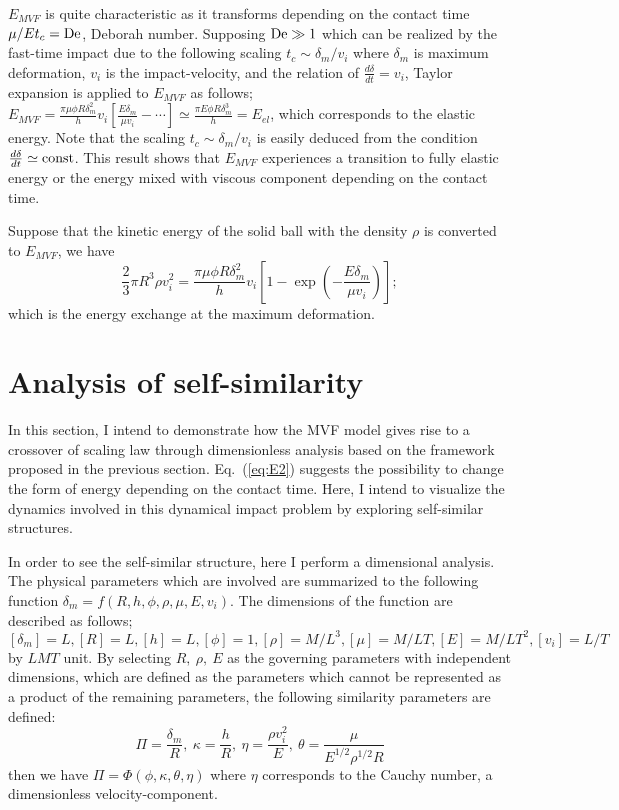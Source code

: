 \documentclass[default,iicol,10pt]{sn-jnl}%
\theoremstyle{thmstyleone}%
\theoremstyle{thmstyletwo}%
\theoremstyle{thmstylethree}%
\begin{document}
$E_{MVF}$ is quite characteristic as it transforms depending on the contact time $ \mu / E t_c =  {\rm De}$, Deborah number\cite{Reiner}. Supposing  ${\rm De} \gg 1$ which can be realized by the fast-time impact due to the following scaling $t_c \sim \delta_m / {v_i}$ where $\delta_m$ is maximum deformation, $v_i$ is the impact-velocity, and the relation of $\frac{ d \delta}{dt} = v_i$,  Taylor expansion is applied to $E_{MVF}$ as follows; $E_{MVF} = \frac{\pi \mu \phi R \delta_m^2 }{h} v_i \left[  \frac{E \delta_m}{\mu v_i} - \cdots \right] \simeq  \frac{\pi E \phi R \delta_m^3 }{h} = E_{el} $, which corresponds to the elastic energy\cite{Maruoka2019,Chastel2016}. Note that the scaling $t_c \sim \delta_m / v_i$ is easily deduced from the condition $\frac{d \delta}{dt} \simeq {\rm const}$. This result shows that $E_{MVF}$ experiences a transition to fully elastic energy or the energy mixed with viscous component depending on the contact time.

Suppose that the kinetic energy of the solid ball with the density $\rho$ is converted to $E_{MVF}$, we have 
\begin{equation}
\frac{2}{3}\pi R^3 \rho v_i^2  = \frac{\pi \mu \phi R \delta_m^2 }{h} v_i \left[ 1- \exp  \left( - \frac{ E \delta_m}{\mu v_i}\right) \right];
\label{eq:E2}
\end{equation}
which is the energy exchange at the maximum deformation.

\section{Analysis of self-similarity}

In this section, I intend to demonstrate how the MVF model gives rise to a crossover of scaling law through dimensionless analysis based on the framework proposed in the previous section. Eq.~(\ref{eq:E2}) suggests the possibility to change the form of energy depending on the contact time. Here, I intend to visualize the dynamics involved in this dynamical impact problem by exploring self-similar structures.

In order to see the self-similar structure, here I perform a dimensional analysis\cite{DimAna}. The physical parameters which are involved are summarized to the following function $ \delta_{m} = f \left(R, h, \phi, \rho, \mu, E, v_i \right)$. The dimensions of the function are described as follows; $[\delta_{m}] = L, [R] =L, [h] = L, [\phi] = 1, [\rho] = M/L^3, [\mu] = M/LT, [E] = M/LT^2, [v_i] = L/T$ by $LMT$ unit. By selecting $R, ~ \rho,~ E$ as the governing parameters with independent dimensions, which are defined as the parameters which cannot be represented as a product of the remaining parameters, the following similarity parameters are defined: 
\begin{equation}
\Pi = \frac{\delta_m}{R},~\kappa = \frac{h}{R}, ~\eta = \frac{\rho v_i^2}{E},~\theta = \frac{\mu}{E^{1/2} \rho^{1/2} R}
\label{eq:E3}
\end{equation}
then we have $\Pi = \Phi ( \phi, \kappa, \theta, \eta)$ where $\eta$ corresponds to the Cauchy number, a dimensionless velocity-component. 
\end{document}
